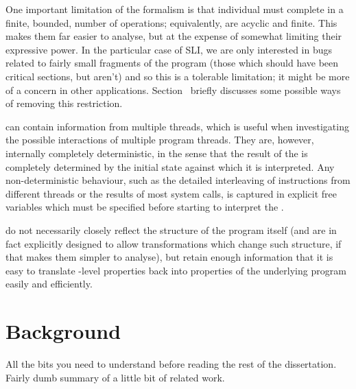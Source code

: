 One important limitation of the \StateMachine formalism is that individual \StateMachines must complete in a finite, bounded, number of operations; equivalently, \StateMachines are acyclic and finite.
This makes them far easier to analyse, but at the expense of somewhat limiting their expressive power.
In the particular case of SLI, we are only interested in bugs related to fairly small fragments of the program (those which should have been critical sections, but aren't) and so this is a tolerable limitation; it might be more of a concern in other applications.
Section~ briefly discusses some possible ways of removing this restriction.

\STateMachines can contain information from multiple threads, which is useful when investigating the possible interactions of multiple program threads.
They are, however, internally completely deterministic, in the sense that the result of the \StateMachine is completely determined by the initial state against which it is interpreted.
Any non-deterministic behaviour, such as the detailed interleaving of instructions from different threads or the results of most system calls, is captured in explicit free variables which must be specified before starting to interpret the \StateMachine.

\STateMachines do not necessarily closely reflect the structure of the
program itself (and are in fact explicitly designed to allow
transformations which change such structure, if that makes them
simpler to analyse), but retain enough information that it is easy to
translate \StateMachine-level properties back into properties of
the underlying program easily and efficiently.


\section{Background}
All the bits you need to understand before reading the rest of the dissertation.
Fairly dumb summary of a little bit of related work.
